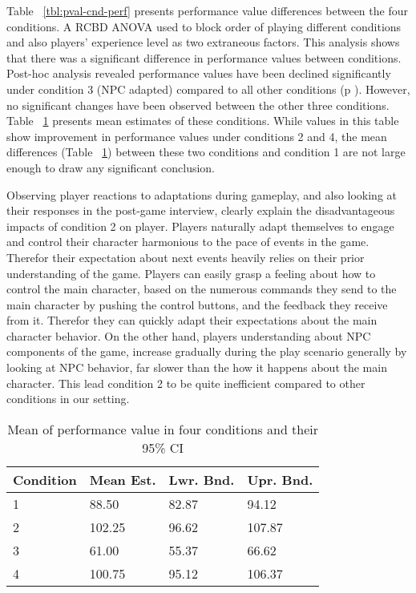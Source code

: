 \documentclass[conference]{IEEEtran}
\begin{document}
Table ~\ref{tbl:pval-cnd-perf} presents performance value differences between the four conditions. A RCBD ANOVA used to block order of playing different conditions and also players' experience level as two extraneous factors. This analysis shows that there was a significant difference in performance values between conditions. Post-hoc analysis revealed performance values have been declined significantly under condition 3 (NPC adapted) compared to all other conditions (p ). However, no significant changes have been observed between the other three conditions. Table ~\ref{tbl:mean-cnd-perf} presents mean estimates of these conditions. While values in this table show improvement in performance values under conditions 2 and 4, the mean differences (Table ~\ref{tbl:mean-cnd-perf}) between these two conditions and condition 1 are not large enough to draw any significant conclusion.

Observing player reactions to adaptations during gameplay, and also looking at their responses in the post-game interview, clearly explain the disadvantageous impacts of condition 2 on player. Players naturally adapt themselves to engage and control their character harmonious to the pace of events in the game. Therefor their expectation about next events heavily relies on their prior understanding of the game. Players can easily grasp a feeling about how to control the main character, based on the numerous commands they send to the main character by pushing the control buttons, and the feedback they receive from it. Therefor they can quickly adapt their expectations about the main character behavior. On the other hand, players understanding about NPC components of the game, increase gradually during the play scenario generally by looking at NPC behavior, far slower than the how it happens about the main character. This lead condition 2 to be quite inefficient compared to other conditions in our setting.

\begin{table}[h]
\caption{Mean of performance value in four conditions and their 95\% CI}
\label{tbl:mean-cnd-perf}
\centering
\begin{tabular}{llll}
\hline
Condition      &   Mean Est.      &   Lwr. Bnd.    &  Upr. Bnd.     \\
\hline
1              &   88.50          &   82.87        &  94.12         \\
2              &   102.25         &   96.62        &  107.87        \\
3              &   61.00          &   55.37        &  66.62         \\
4              &   100.75         &   95.12        &  106.37        \\
\hline
\end{tabular}
\end{table}
\end{document}
